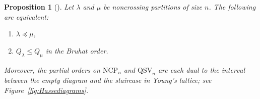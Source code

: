 \documentclass[submission]{FPSAC2024}
\newtheorem{prop}[equation]{Proposition}
\theoremstyle{definition}
\theoremstyle{remark}
\numberwithin{equation}{section}
\newcommand{\QSV}{\mathrm{QSV}}
\newcommand{\NCP}{\mathrm{NCP}}
\begin{document}
\begin{prop}[{\cite[Theorem 1.1 and Corollary 7.5]{GW16}}]
\label{prop:QSVorderbijection}
Let $\lambda$ and $\mu$ be noncrossing partitions of size $n$.  The following are equivalent:
\begin{enumerate}[itemsep =-.5ex]
\item $\lambda \preceq \mu$, 

\item $Q_{\lambda} \le Q_{\mu}$ in the Bruhat order.%

\end{enumerate}
Moreover, the partial orders on $\NCP_{n}$ and $\QSV_{n}$ are each dual to the interval between the empty diagram and the staircase in Young's lattice; see Figure~\ref{fig:Hassediagrams}.
\end{prop}

\end{document}
